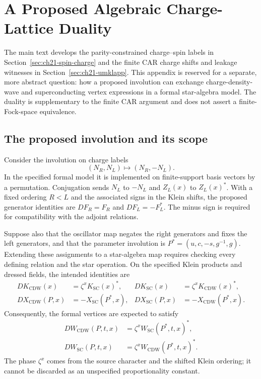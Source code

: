 \chapter[An Algebraic Charge-Lattice Duality]{A Proposed Algebraic Charge-Lattice Duality}
\label{app:duality_spin_umklapp}

The main text develops the parity-constrained charge--spin labels in
Section~\ref{sec:ch21-spin-charge} and the finite CAR charge shifts and
leakage witnesses in Section~\ref{sec:ch21-umklapp}. This appendix is
reserved for a separate, more abstract question: how a proposed involution
can exchange charge-density-wave and superconducting vertex expressions in
a formal star-algebra model. The duality is supplementary to the finite CAR
argument and does not assert a finite-Fock-space equivalence.

\section{The proposed involution and its scope}

Consider the involution on charge labels
\begin{equation}
 (N_R,N_L)\longmapsto(N_R,-N_L).
 \label{eq:a09-charge-duality}
\end{equation}
In the specified formal model it is implemented on finite-support basis
vectors by a permutation. Conjugation sends $N_L$ to $-N_L$ and $Z_L(x)$ to
$Z_L(x)^*$. With a fixed ordering $R<L$ and the associated signs in the
Klein shifts, the proposed generator identities are $DF_R=F_R$ and
$DF_L=-F_L^*$. The minus sign is required for compatibility with the
adjoint relations.

Suppose also that the oscillator map negates the right generators and fixes
the left generators, and that the parameter involution is
$P^*=(u,c,-s,g^{-1},g)$. Extending these assignments to a star-algebra map
requires checking every defining relation and the star operation. On the
specified Klein products and dressed fields, the intended identities are
\begin{align}
 DK_{\mathrm{CDW}}(x)&=\zeta^xK_{\mathrm{SC}}(x)^*,&
 DK_{\mathrm{SC}}(x)&=\zeta^xK_{\mathrm{CDW}}(x)^*,\\
 DX_{\mathrm{CDW}}(P,x)&=-X_{\mathrm{SC}}(P^*,x),&
 DX_{\mathrm{SC}}(P,x)&=-X_{\mathrm{CDW}}(P^*,x).
 \label{eq:a09-duality-generators}
\end{align}
Consequently, the formal vertices are expected to satisfy
\begin{align}
 DW_{\mathrm{CDW}}(P,t,x)
   &=\zeta^xW_{\mathrm{SC}}(P^*,t,x)^*,\\
 DW_{\mathrm{SC}}(P,t,x)
   &=\zeta^xW_{\mathrm{CDW}}(P^*,t,x)^*.
 \label{eq:a09-duality-vertices}
\end{align}
The phase $\zeta^x$ comes from the source character and the shifted Klein
ordering; it cannot be discarded as an unspecified proportionality
constant.

